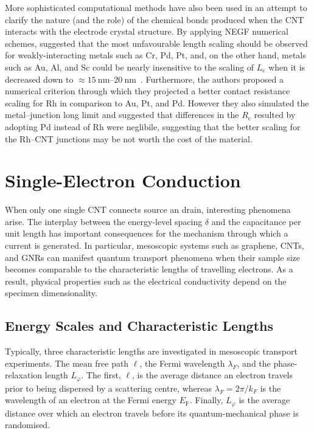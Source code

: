 More sophisticated computational methods have also been used in an attempt to  clarify the nature (and the role) of the chemical bonds produced when the \gls{CNT} interacts with the electrode crystal structure. By applying \gls{NEGF} numerical schemes, \citeauthor{fediai2016towards} suggested that the most unfavourable length scaling should be observed for weakly-interacting metals such as Cr, Pd, Pt, and, on the other hand, metals such as Au, Al, and Sc could be nearly insensitive to the scaling of $L_\textrm{c}$ when it is decreased down to $\approx\SIrange{15}{20}{\nano\metre}$~\cite{fediai2016towards}. Furthermore, the authors proposed a numerical criterion through which they projected a better contact resistance scaling for Rh in comparison to Au, Pt, and Pd. However they also simulated the metal--junction long limit and suggested that differences in the $R_\textrm{c}$ resulted by adopting Pd instead of Rh were neglibile, suggesting that the better scaling for the Rh--\gls{CNT} junctions may be not worth the cost of the material.

\section{Single-Electron Conduction}\label{ch:intro:sec:single_electron_conduction}

When only one single \gls{CNT} connects source an drain, interesting phenomena arise. The interplay between the energy-level spacing $\delta$ and the capacitance per unit length has important consequences for the mechanism through which a current is generated. In particular, mesoscopic systems such as graphene, \glspl{CNT}, and \glspl{GNR} can manifest quantum transport phenomena when their sample size becomes comparable to the characteristic lengths of travelling electrons. As a result, physical properties such as the electrical conductivity depend on the specimen dimensionality.

\subsection{Energy Scales and Characteristic Lengths}\label{ch:theory:sec:energy_exchange}

Typically, three characteristic lengths are investigated in mesoscopic transport experiments. The mean free path $\ell$, the Fermi wavelength $\lambda_{F}$, and the phase-relaxation length $L_{\varphi}$. The first, $\ell$, is the average distance an electron travels prior to being dispersed by a scattering centre, whereas $\lambda_{F}=2 \pi / k_{F}$ is the wavelength of an electron at the Fermi energy $E_\textrm{F}$. Finally, $L_{\varphi}$ is the average distance over which an electron travels before its quantum-mechanical phase is randomised.

